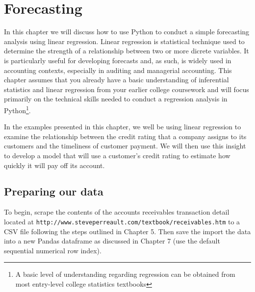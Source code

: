 \documentclass{book}
\begin{document}
\chapter{Forecasting}

In this chapter we will discuss how to use Python to conduct a simple forecasting analysis using linear regression. Linear regression is statistical technique used to determine the strength of a relationship between two or more dicrete variables. It is particularly useful for developing forecasts and, as such, is widely used in accounting contexts, especially in auditing and managerial accounting. This chapter assumes that you already have a basic understanding of inferential statistics and linear regression from your earlier college coursework and will focus primarily on the technical skills needed to conduct a regression analysis in Python\footnote{A basic level of understanding regarding regression can be obtained from most entry-level college statistics textbooks}. 

In the examples presented in this chapter, we well be using linear regression to examine the relationship between the credit rating that a company assigns to its customers and the timeliness of customer payment. We will then use this insight to develop a model that will use a customer's credit rating to estimate how quickly it will pay off its account.  

\section{Preparing our data}

To begin, scrape the contents of the accounts receivables transaction detail located at \texttt{http://www.steveperreault.com/textbook/receivables.htm} to a CSV file following the steps outlined in Chapter 5. Then save the import the data into a new Pandas dataframe as discussed in Chapter 7 (use the default sequential numerical row index).
\end{document}
